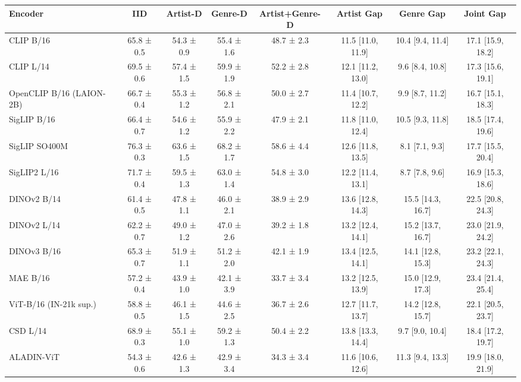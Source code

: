 \begin{tabular}{lccccccc}
\toprule
Encoder & IID & Artist-D & Genre-D & Artist+Genre-D & Artist Gap & Genre Gap & Joint Gap \\
\midrule
CLIP B/16 & 65.8 ± 0.5 & 54.3 ± 0.9 & 55.4 ± 1.6 & 48.7 ± 2.3 & 11.5 [11.0, 11.9] & 10.4 [9.4, 11.4] & 17.1 [15.9, 18.2] \\
CLIP L/14 & 69.5 ± 0.6 & 57.4 ± 1.5 & 59.9 ± 1.9 & 52.2 ± 2.8 & 12.1 [11.2, 13.0] & 9.6 [8.4, 10.8] & 17.3 [15.6, 19.1] \\
OpenCLIP B/16 (LAION-2B) & 66.7 ± 0.4 & 55.3 ± 1.2 & 56.8 ± 2.1 & 50.0 ± 2.7 & 11.4 [10.7, 12.2] & 9.9 [8.7, 11.2] & 16.7 [15.1, 18.3] \\
SigLIP B/16 & 66.4 ± 0.7 & 54.6 ± 1.2 & 55.9 ± 2.2 & 47.9 ± 2.1 & 11.8 [11.0, 12.4] & 10.5 [9.3, 11.8] & 18.5 [17.4, 19.6] \\
SigLIP SO400M & 76.3 ± 0.3 & 63.6 ± 1.5 & 68.2 ± 1.7 & 58.6 ± 4.4 & 12.6 [11.8, 13.5] & 8.1 [7.1, 9.3] & 17.7 [15.5, 20.4] \\
SigLIP2 L/16 & 71.7 ± 0.4 & 59.5 ± 1.3 & 63.0 ± 1.4 & 54.8 ± 3.0 & 12.2 [11.4, 13.1] & 8.7 [7.8, 9.6] & 16.9 [15.3, 18.6] \\
DINOv2 B/14 & 61.4 ± 0.5 & 47.8 ± 1.1 & 46.0 ± 2.1 & 38.9 ± 2.9 & 13.6 [12.8, 14.3] & 15.5 [14.3, 16.7] & 22.5 [20.8, 24.3] \\
DINOv2 L/14 & 62.2 ± 0.7 & 49.0 ± 1.2 & 47.0 ± 2.6 & 39.2 ± 1.8 & 13.2 [12.4, 14.1] & 15.2 [13.7, 16.7] & 23.0 [21.9, 24.2] \\
DINOv3 B/16 & 65.3 ± 0.7 & 51.9 ± 1.1 & 51.2 ± 2.0 & 42.1 ± 1.9 & 13.4 [12.5, 14.1] & 14.1 [12.8, 15.3] & 23.2 [22.1, 24.3] \\
MAE B/16 & 57.2 ± 0.4 & 43.9 ± 1.0 & 42.1 ± 3.9 & 33.7 ± 3.4 & 13.2 [12.5, 13.9] & 15.0 [12.9, 17.3] & 23.4 [21.4, 25.4] \\
ViT-B/16 (IN-21k sup.) & 58.8 ± 0.5 & 46.1 ± 1.5 & 44.6 ± 2.5 & 36.7 ± 2.6 & 12.7 [11.7, 13.7] & 14.2 [12.8, 15.7] & 22.1 [20.5, 23.7] \\
CSD L/14 & 68.9 ± 0.3 & 55.1 ± 1.0 & 59.2 ± 1.3 & 50.4 ± 2.2 & 13.8 [13.3, 14.4] & 9.7 [9.0, 10.4] & 18.4 [17.2, 19.7] \\
ALADIN-ViT & 54.3 ± 0.6 & 42.6 ± 1.3 & 42.9 ± 3.4 & 34.3 ± 3.4 & 11.6 [10.6, 12.6] & 11.3 [9.4, 13.3] & 19.9 [18.0, 21.9] \\
\bottomrule
\end{tabular}
